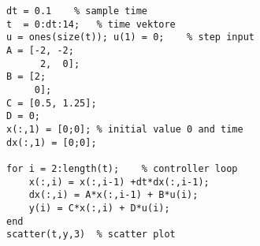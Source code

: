 \documentclass[../main.tex]{subfiles}
\begin{document}
\begin{lstlisting}[style=Matlab]
dt = 0.1    % sample time
t  = 0:dt:14;   % time vektore
u = ones(size(t)); u(1) = 0;    % step input
A = [-2, -2;
      2,  0];
B = [2;
     0];
C = [0.5, 1.25];
D = 0;
x(:,1) = [0;0]; % initial value 0 and time 
dx(:,1) = [0;0];

for i = 2:length(t);    % controller loop
    x(:,i) = x(:,i-1) +dt*dx(:,i-1); 
    dx(:,i) = A*x(:,i-1) + B*u(i);
    y(i) = C*x(:,i) + D*u(i);
end
scatter(t,y,3)  % scatter plot
\end{lstlisting}
\end{document}
